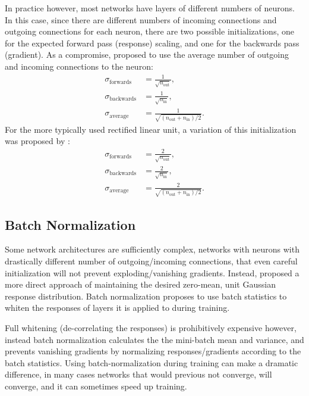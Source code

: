 \documentclass[thesis]{subfiles}
\begin{document}
In practice however, most networks have layers of different numbers of neurons. In this case, since there are different numbers of incoming connections and outgoing connections for each neuron, there are two possible initializations, one for the expected forward pass (response) scaling, and one for the backwards pass (gradient). As a compromise, \citet{glorot2010understanding} proposed to use the average number of outgoing and incoming connections to the neuron:
%
\begin{equation}
\begin{aligned}
	\sigma_{\textrm{forwards}} &= \frac{1}{\sqrt{n_{\text{out}}}},\\
	\sigma_{\textrm{backwards}} &= \frac{1}{\sqrt{n_{\text{in}}}},\\
	\sigma_{\textrm{average}} &= \frac{1}{\sqrt{(n_{\text{out}} + n_{\text{in}})/2}}.
\end{aligned}
\end{equation}
%
For the more typically used rectified linear unit, a variation of this initialization was proposed by \citet{He2015b}:
%
\begin{equation}
\begin{aligned}
	\sigma_{\textrm{forwards}} &= \frac{2}{\sqrt{n_{\text{out}}}},\\
	\sigma_{\textrm{backwards}} &= \frac{2}{\sqrt{n_{\text{in}}}},\\
	\sigma_{\textrm{average}} &= \frac{2}{\sqrt{(n_{\text{out}} + n_{\text{in}})/2}}.
\end{aligned}
\end{equation}
%
\subsection{Batch Normalization}
Some network architectures are sufficiently complex, \eg{}networks with neurons with drastically different number of outgoing/incoming connections, that even careful initialization will not prevent exploding/vanishing gradients. Instead, \citet{Ioffe2015} proposed a more direct approach of maintaining the desired zero-mean, unit Gaussian response distribution. Batch normalization proposes to use batch statistics to whiten the responses of layers it is applied to during training.

Full whitening (\ie{}de-correlating the responses) is prohibitively expensive however, instead batch normalization calculates the the mini-batch mean and variance, and prevents vanishing gradients by normalizing responses/gradients according to the batch statistics. Using batch-normalization during training can make a dramatic difference, in many cases networks that would previous not converge, will converge, and it can sometimes speed up training.
\end{document}
